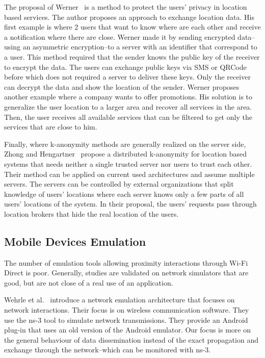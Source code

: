 The proposal of Werner~\cite{DBLP:conf/mobisec/Werner10} is a method to protect the users' privacy in location based services.
The author proposes an approach to exchange location data.
His first example is where 2 users that want to know where are each other and receive a notification where there are close.
Werner made it by sending encrypted data--using an asymmetric encryption--to a server with an identifier that correspond to a user.
This method required that the sender knows the public key of the receiver to encrypt the data.  
The users can exchange public keys via SMS or QRCode before which does not required a server to deliver these keys.
Only the receiver can decrypt the data and show the location of the sender.
Werner proposes another example where a company wants to offer promotions.
His solution is to generalize the user location to a larger area and recover all services in the area.
Then, the user receives all available services that can be filtered to get only the services that are close to him.

Finally, where k-anonymity methods are generally realized on the server side, Zhong and Hengartner~\cite{DBLP:conf/percom/ZhongH09} propose a distributed k-anonymity for location based systems that needs neither a single trusted server nor users to trust each other.
Their method can be applied on current used architectures and assume multiple servers.
The servers can be controlled by external organizations that split knowledge of users' locations where each server knows only a few parts of all users' locations of the system.
In their proposal, the users' requests pass through location brokers that hide the real location of the users.

\subsection{Mobile Devices Emulation}

The number of emulation tools allowing proximity interactions through Wi-Fi Direct is poor.
Generally, studies are validated on network simulators that are good, but are not close of a real use of an application.

Wehrle et al.~\cite{DBLP:conf/simutools/WeingartnerLW11} introduce a network emulation architecture that focuses on network interactions.
Their focus is on wireless communication software.
They use the ns-3 tool to simulate network transmissions.
They provide an Android plug-in that uses an old version of the Android emulator.
Our focus is more on the general behaviour of data dissemination instead of the exact propagation and exchange through the network--which can be monitored with ns-3.

